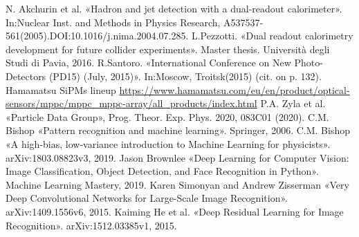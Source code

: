 \documentclass[a4paper,11pt,titlepage,oneside]{book}	%
\begin{document}
\begin{backmatter}
\begin{thebibliography}{99}
			 N. Akchurin et al. «Hadron and jet detection with a dual-readout calorimeter». In:Nuclear Inst. and Methods in Physics Research, A537537-561(2005).DOI:10.1016/j.nima.2004.07.285.
			 L.Pezzotti. «Dual readout calorimetry development for future collider experiments». Master thesis. Università degli Studi di Pavia, 2016.
			 R.Santoro. «International Conference on New Photo-Detectors (PD15) (July, 2015)». In:Moscow, Troitsk(2015) (cit. on p. 132).
			 Hamamatsu SiPMs lineup \url{https://www.hamamatsu.com/eu/en/product/optical-sensors/mppc/mppc_mppc-array/all_products/index.html}
			 P.A. Zyla et al. «Particle Data Group», Prog. Theor. Exp. Phys. 2020, 083C01 (2020). 
			 C.M. Bishop «Pattern recognition and machine learning». Springer, 2006. 
			 C.M. Bishop «A high-bias, low-variance introduction to Machine Learning for physicists». arXiv:1803.08823v3, 2019. 
			 Jason Brownlee «Deep Learning for Computer Vision: Image Classification, Object Detection, and Face Recognition in Python». Machine Learning Mastery, 2019.
			 Karen Simonyan and Andrew Zisserman «Very Deep Convolutional Networks for Large-Scale Image Recognition». arXiv:1409.1556v6, 2015.
			 Kaiming He et al. «Deep Residual Learning for Image Recognition». arXiv:1512.03385v1, 2015.
			
		\end{thebibliography}
		
	\end{backmatter}
	
	
\end{document}
